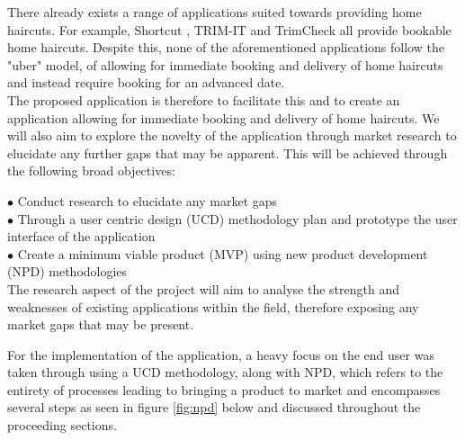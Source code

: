 \documentclass[12pt]{article}
\begin{document}
	There already exists a range of applications suited towards providing home haircuts. For example, Shortcut \cite{incShortcutInHomeHaircuts}, TRIM-IT\cite{TRIMITMobileBarbershopsa} and TrimCheck\cite{TrimCheckHomeHaircuts} all provide bookable home haircuts. Despite this, none of the aforementioned applications follow the "uber" model, of allowing for immediate booking and delivery of home haircuts and instead require booking for an advanced date. 
	\\
	
	The proposed application is therefore to facilitate this and to create an application allowing for immediate booking and delivery of home haircuts. We will also aim to explore the novelty of the application through market research to elucidate any further gaps that may be apparent. This will be achieved through the following broad objectives: 
	

	$\bullet$ Conduct research to elucidate any market gaps
	\\
	$\bullet$ Through a user centric design (UCD) methodology plan and prototype the user interface of the application
	\\
	$\bullet$ Create a minimum viable product (MVP) using new product development (NPD) methodologies
	\\
	
	The research aspect of the project will aim to analyse the strength and weaknesses of existing applications within the field, therefore exposing any market gaps that may be present. 
	
	For the implementation of the application, a heavy focus on the end user was taken through using a UCD methodology, along with NPD, which refers to the  entirety of processes leading to bringing a product to market and encompasses several steps as seen in figure \ref{fig:npd} below and discussed throughout the proceeding sections.
	\newline
	
\end{document}
